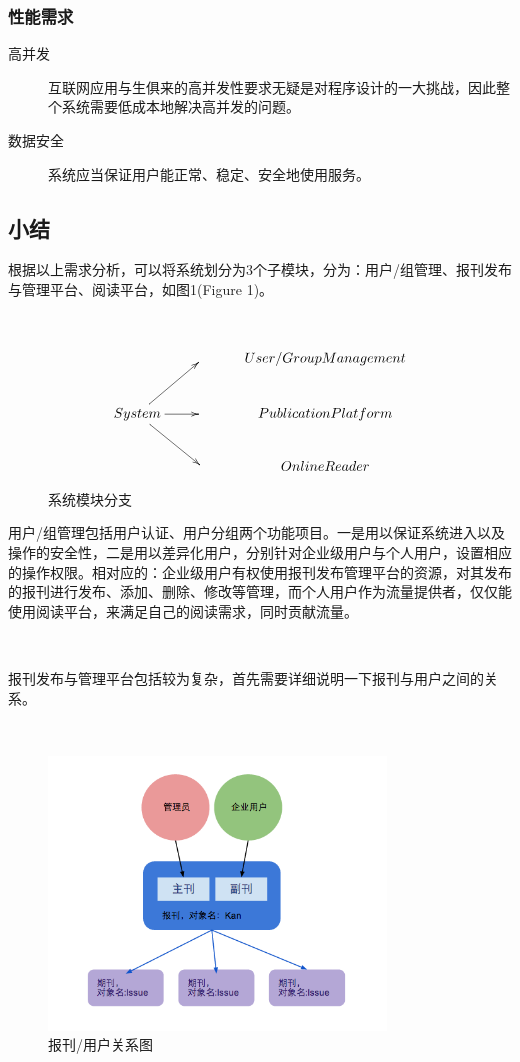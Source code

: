 \subsubsection{性能需求}
\begin{description}
	\item[高并发] 互联网应用与生俱来的高并发性要求无疑是对程序设计的一大挑战，因此整个系统需要低成本地解决高并发的问题。
	\item[数据安全] 系统应当保证用户能正常、稳定、安全地使用服务。
\end{description}

\subsection{小结}
根据以上需求分析，可以将系统划分为3个子模块，分为：用户/组管理、报刊发布与管理平台、阅读平台，如图1(Figure 1)。
\par~

\begin{figure}
\begin{displaymath}
	\xymatrix{
	  			 && User/Group Management \\
	  System \ar[ur] \ar[r] \ar[dr] && Publication Platform \\
	  			 && Online Reader }
\end{displaymath}
\caption{系统模块分支}
\end{figure}

\indent
用户/组管理包括用户认证、用户分组两个功能项目。一是用以保证系统进入以及操作的安全性，二是用以差异化用户，分别针对企业级用户与个人用户，设置相应的操作权限。相对应的：企业级用户有权使用报刊发布管理平台的资源，对其发布的报刊进行发布、添加、删除、修改等管理，而个人用户作为流量提供者，仅仅能使用阅读平台，来满足自己的阅读需求，同时贡献流量。
\par~

\indent
报刊发布与管理平台包括较为复杂，首先需要详细说明一下报刊与用户之间的关系。
\par~

\begin{figure}
	\centering
		\includegraphics[width=0.8\textwidth]{./images/chap1-1.png}
	\caption{报刊/用户关系图}
\end{figure}

